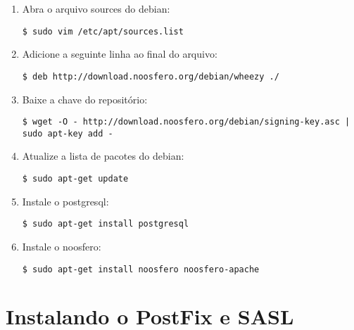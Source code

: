 \begin{enumerate}[label=\alph*)]

\item Abra o arquivo sources do debian:
\begin{lstlisting}
$ sudo vim /etc/apt/sources.list
\end{lstlisting}

\item Adicione a seguinte linha ao final do arquivo:
\begin{lstlisting}
$ deb http://download.noosfero.org/debian/wheezy ./
\end{lstlisting}

\item Baixe a chave do repositório:
\begin{lstlisting}[numbers=none, breaklines=true]
$ wget -O - http://download.noosfero.org/debian/signing-key.asc | sudo apt-key add -
\end{lstlisting}

\item Atualize a lista de pacotes do debian:
\begin{lstlisting}
$ sudo apt-get update
\end{lstlisting}

\item Instale o postgresql:
\begin{lstlisting}
$ sudo apt-get install postgresql
\end{lstlisting}

\item Instale o noosfero:
\begin{lstlisting}
$ sudo apt-get install noosfero noosfero-apache
\end{lstlisting}

\end{enumerate}

\section{Instalando o PostFix e SASL}

